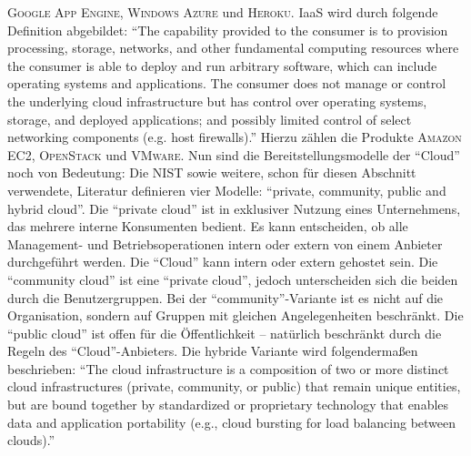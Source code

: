 \textsc{Google App Engine}, \textsc{Windows Azure} und \textsc{Heroku}.\autocite[vgl.][S.\,8]{kumar_reliability_2018} \ac{IaaS} wird durch folgende Definition abgebildet: \enquote{The capability provided to the consumer is to provision processing, storage, networks, and other fundamental computing resources where the consumer is able to deploy and run arbitrary software, which can include operating systems and applications. The consumer does not manage or control the underlying cloud infrastructure but has control over operating systems, storage, and deployed applications; and possibly limited control of select networking components (e.g. host firewalls).}\autocite[][S.\,3]{mell_nist_2011} Hierzu zählen die Produkte \textsc{Amazon EC2}, \textsc{OpenStack} und \textsc{VMware}. Nun sind die Bereitstellungsmodelle der \enquote{Cloud} noch von Bedeutung: Die \ac{NIST} sowie weitere, schon für diesen Abschnitt verwendete, Literatur definieren vier Modelle: \enquote{private, community, public and hybrid cloud}. Die \enquote{private cloud} ist in exklusiver Nutzung eines Unternehmens, das mehrere interne Konsumenten bedient. Es kann entscheiden, ob alle Management- und Betriebsoperationen intern oder extern von einem Anbieter durchgeführt werden. Die \enquote{Cloud} kann intern oder extern gehostet sein. Die \enquote{community cloud} ist eine \enquote{private cloud}, jedoch unterscheiden sich die beiden durch die Benutzergruppen. Bei der \enquote{community}-Variante ist es nicht auf die Organisation, sondern auf Gruppen mit gleichen Angelegenheiten beschränkt. Die \enquote{public cloud} ist offen für die Öffentlichkeit --  natürlich beschränkt durch die Regeln des \enquote{Cloud}-Anbieters. Die hybride Variante wird folgendermaßen beschrieben: \enquote{The cloud infrastructure is a composition of two or more distinct cloud infrastructures (private, community, or public) that remain unique entities, but are bound together by standardized or proprietary technology that enables data and application portability (e.g., cloud bursting for load balancing between clouds).}\autocite[][S.\,3]{mell_nist_2011}


